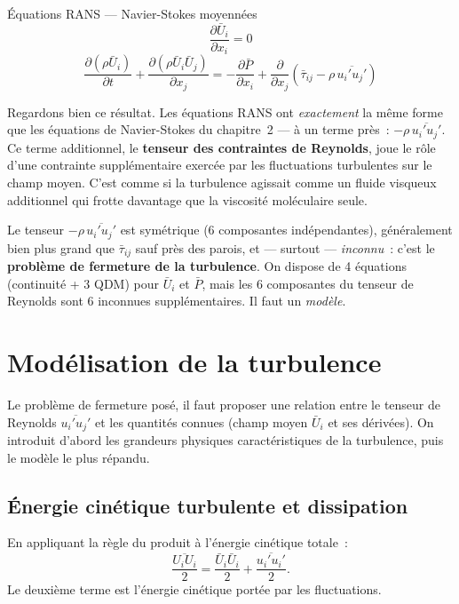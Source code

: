 \documentclass[11pt,a4paper]{report}
\begin{document}
\begin{importantbox}{\'Equations RANS --- Navier-Stokes moyenn\'ees}
\[
  \frac{\partial\bar{U}_i}{\partial x_i} = 0
\]
\[
  \frac{\partial(\rho\bar{U}_i)}{\partial t}
  + \frac{\partial(\rho\bar{U}_i\bar{U}_j)}{\partial x_j}
  = -\frac{\partial\bar{P}}{\partial x_i}
  + \frac{\partial}{\partial x_j}\!\left(
    \bar{\tau}_{ij} - \rho\,\overline{u_i' u_j'}
  \right)
\]
\end{importantbox}

Regardons bien ce r\'esultat. Les \'equations RANS ont \emph{exactement} la m\^eme forme que
les \'equations de Navier-Stokes du chapitre~2 --- \`a un terme pr\`es~:
$-\rho\,\overline{u_i'u_j'}$. Ce terme additionnel, le \textbf{tenseur des contraintes de
Reynolds}, joue le r\^ole d'une contrainte suppl\'ementaire exerc\'ee par les fluctuations
turbulentes sur le champ moyen. C'est comme si la turbulence agissait comme un fluide
visqueux additionnel qui frotte davantage que la viscosit\'e mol\'eculaire seule.

Le tenseur $-\rho\,\overline{u_i'u_j'}$ est sym\'etrique (6 composantes ind\'ependantes),
g\'en\'eralement bien plus grand que $\bar{\tau}_{ij}$
sauf pr\`es des parois, et --- surtout --- \emph{inconnu}~: c'est le
\textbf{probl\`eme de fermeture de la turbulence}. On dispose de 4 \'equations (continuit\'e + 3 QDM)
pour $\bar{U}_i$ et $\bar{P}$, mais les 6 composantes du tenseur de Reynolds sont 6
inconnues suppl\'ementaires. Il faut un \emph{mod\`ele}.

\section{Mod\'elisation de la turbulence}

Le probl\`eme de fermeture pos\'e, il faut proposer une relation entre le tenseur de
Reynolds $\overline{u_i'u_j'}$ et les quantit\'es connues (champ moyen $\bar{U}_i$ et ses
d\'eriv\'ees). On introduit d'abord les grandeurs physiques caract\'eristiques de la
turbulence, puis le mod\`ele le plus r\'epandu.

\subsection{\'Energie cin\'etique turbulente et dissipation}

En appliquant la r\`egle du produit \`a l'\'energie cin\'etique totale~:
\[
  \frac{\overline{U_i U_i}}{2} = \frac{\bar{U}_i\bar{U}_i}{2}
  + \frac{\overline{u_i'u_i'}}{2}.
\]
Le deuxi\`eme terme est l'\'energie cin\'etique port\'ee par les fluctuations.
\end{document}
